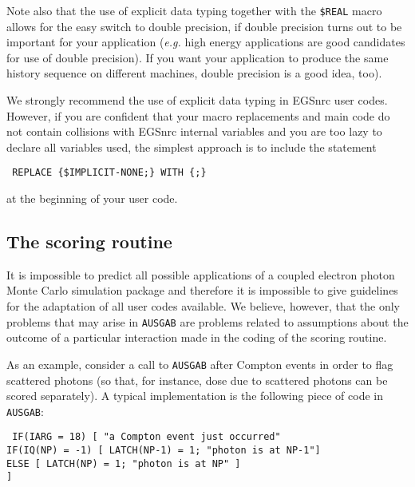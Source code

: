 Note also that the use of explicit data typing together with the
{\tt \$REAL} macro allows for the easy switch to double precision,
if double precision turns out to be important for your
application ({\em e.g.} high energy applications are good
candidates for use of double precision). If you want your
application to produce the same history sequence on different
machines, double precision is a good idea, too).

We strongly recommend the use of explicit data typing
in EGSnrc user codes. However,  if you are confident
that your macro replacements and main code do not
contain collisions with EGSnrc internal variables and
you are too lazy to declare all variables used, the
simplest approach  is to include the statement
\begin{flushleft}{\tt
REPLACE \{\$IMPLICIT-NONE;\} WITH \{;\} }
\end{flushleft}

\noindent
at the beginning of your user code.


\subsection{The scoring routine}
\label{scoring}

It is impossible to predict all possible applications of a coupled
electron photon Monte Carlo simulation package and therefore it is
impossible to give guidelines for the adaptation of all user codes
available. We believe, however, that the only problems that may arise
in {\tt AUSGAB} are problems related to assumptions about the outcome
of a particular interaction made in the coding of the scoring routine.

As an example, consider
a call to {\tt AUSGAB} after Compton
events in order to flag scattered photons
(so that, for instance, dose due to scattered photons can
be scored separately).  A typical implementation is the
following piece of code in {\tt AUSGAB}:
\begin{flushleft}{\tt
IF(IARG = 18) [ "a Compton event just occurred"\\
\quad IF(IQ(NP) = -1) [ LATCH(NP-1) = 1; "photon is at NP-1"] \\
\quad ELSE [ LATCH(NP) = 1; "photon is at NP" ] \\
] }
\end{flushleft}

